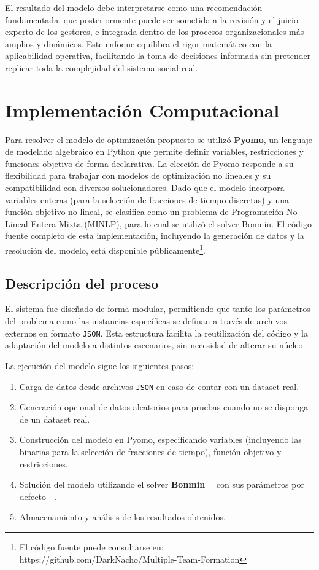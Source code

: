 \documentclass[conference]{IEEEtran}
\begin{document}
El resultado del modelo debe interpretarse como una recomendación fundamentada, que posteriormente puede ser sometida a la revisión y el juicio experto de los gestores, e integrada dentro de los procesos organizacionales más amplios y dinámicos. Este enfoque equilibra el rigor matemático con la aplicabilidad operativa, facilitando la toma de decisiones informada sin pretender replicar toda la complejidad del sistema social real.


\section{Implementación Computacional}

Para resolver el modelo de optimización propuesto se utilizó \textbf{Pyomo}\cite{pyomo_hart2011}, un lenguaje de modelado algebraico en Python que permite definir variables, restricciones y funciones objetivo de forma declarativa. La elección de Pyomo responde a su flexibilidad para trabajar con modelos de optimización no lineales y su compatibilidad con diversos solucionadores. Dado que el modelo incorpora variables enteras (para la selección de fracciones de tiempo discretas) y una función objetivo no lineal, se clasifica como un problema de Programación No Lineal Entera Mixta (MINLP), para lo cual se utilizó el solver Bonmin\cite{bonmin_bonami2008}. El código fuente completo de esta implementación, incluyendo la generación de datos y la resolución del modelo, está disponible públicamente\footnote{El código fuente puede consultarse en: https://github.com/DarkNacho/Multiple-Team-Formation}.

\subsection{Descripción del proceso}

El sistema fue diseñado de forma modular, permitiendo que tanto los parámetros del problema como las instancias específicas se definan a través de archivos externos en formato \texttt{JSON}. Esta estructura facilita la reutilización del código y la adaptación del modelo a distintos escenarios, sin necesidad de alterar su núcleo.

La ejecución del modelo sigue los siguientes pasos:
\begin{enumerate}
    \item Carga de datos desde archivos \texttt{JSON} en caso de contar con un dataset real.
    \item Generación opcional de datos aleatorios para pruebas cuando no se disponga de un dataset real.
    \item Construcción del modelo en Pyomo, especificando variables (incluyendo las binarias para la selección de fracciones de tiempo), función objetivo y restricciones.
    \item Solución del modelo utilizando el solver \textbf{Bonmin} ~~con sus parámetros por defecto~~.
    \item Almacenamiento y análisis de los resultados obtenidos.
\end{enumerate}
\end{document}
